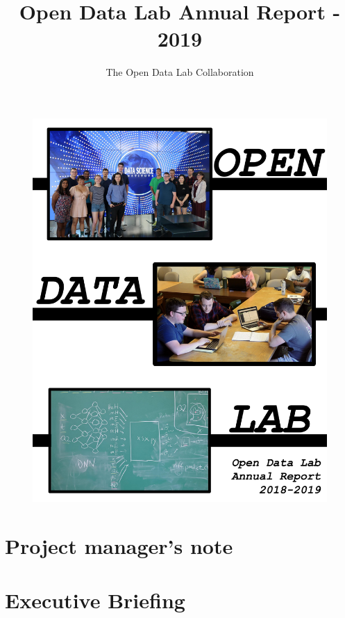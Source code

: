 \documentclass[12pt,letterpaper]{report} %
\title{Open Data Lab Annual Report - 2019}
\author{The Open Data Lab Collaboration}
\begin{document}

\cleardoublepage
\maketitle

\cleardoublepage
\begin{figure}[!hbtp]
\includegraphics[width=\textwidth]{cover-images/ODLFrontCover-nontrans}
\end{figure}

\newpage

\chapter*{Project manager's note}   %
\chapter*{Executive Briefing}
\end{document}
